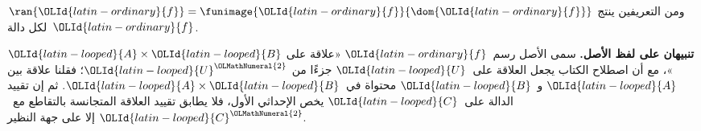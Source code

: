 \documentclass[../../../include/open-logic-section]{subfiles}
\begin{document}
\begin{explain}
ومن التعريفين ينتج $\ran{\OLId{latin-ordinary}{f}} =
\funimage{\OLId{latin-ordinary}{f}}{\dom{\OLId{latin-ordinary}{f}}}$ لكل دالة~$\OLId{latin-ordinary}{f}$.
\end{explain}

\begin{explain}
\textbf{تنبيهان على لفظ الأصل.} سمى الأصل رسم~$\OLId{latin-ordinary}{f}$ «علاقة على
$\OLId{latin-looped}{A}\times \OLId{latin-looped}{B}$»، مع أن اصطلاح الكتاب يجعل العلاقة على~$\OLId{latin-looped}{U}$ جزءًا من
$\OLId{latin-looped}{U}^\OLMathNumeral{2}$؛ فقلنا علاقة بين $\OLId{latin-looped}{A}$ و~$\OLId{latin-looped}{B}$ محتواة في~$\OLId{latin-looped}{A}\times \OLId{latin-looped}{B}$. ثم إن
تقييد الدالة على~$\OLId{latin-looped}{C}$ يخص الإحداثي الأول، فلا يطابق تقييد العلاقة
المتجانسة بالتقاطع مع~$\OLId{latin-looped}{C}^\OLMathNumeral{2}$ إلا على جهة النظير.
\end{explain}
\end{document}

